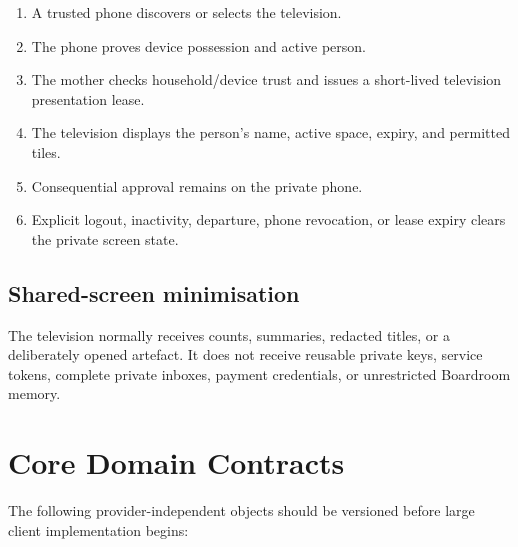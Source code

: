 \documentclass[11pt,a4paper]{article}
\begin{document}
\begin{enumerate}[leftmargin=*]
  \item A trusted phone discovers or selects the television.
  \item The phone proves device possession and active person.
  \item The mother checks household/device trust and issues a short-lived
        television presentation lease.
  \item The television displays the person's name, active space, expiry, and
        permitted tiles.
  \item Consequential approval remains on the private phone.
  \item Explicit logout, inactivity, departure, phone revocation, or lease
        expiry clears the private screen state.
\end{enumerate}

\subsection{Shared-screen minimisation}

The television normally receives counts, summaries, redacted titles, or a
deliberately opened artefact.  It does not receive reusable private keys,
service tokens, complete private inboxes, payment credentials, or unrestricted
Boardroom memory.

\section{Core Domain Contracts}

The following provider-independent objects should be versioned before large
client implementation begins:
\end{document}
